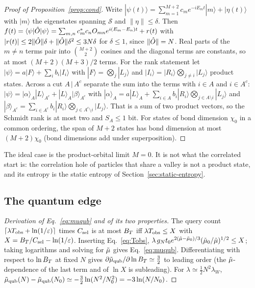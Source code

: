 \begin{proof}[Proof of Proposition~\ref{prop:cond}]
Write $|\psi(t)\rangle=\sum_{m=1}^{M+2}c_m e^{-iE_mt}|m\rangle+|\eta(t)\rangle$ with $|m\rangle$ the eigenstates spanning $\mathcal S$ and $\|\eta\|\le\delta$. Then $f(t)=\langle\psi|\hat O|\psi\rangle=\sum_{m,n}c_m^\ast c_n O_{mn}e^{i(E_m-E_n)t}+r(t)$ with $|r(t)|\le2\|\hat O\|\delta+\|\hat O\|\delta^2\le3N\delta$ for $\delta\le1$, since $\|\hat O\|=N$. Real parts of the $m\ne n$ terms pair into $\binom{M+2}2$ cosines and the diagonal terms are constants, so at most $(M+2)(M+3)/2$ terms. For the rank statement let $|\psi\rangle=a|F\rangle+\sum_ib_i|I_i\rangle$ with $|F\rangle=\bigotimes_j|L_j\rangle$ and $|I_i\rangle=|R_i\rangle\bigotimes_{j\ne i}|L_j\rangle$ product states. Across a cut $A\,|\,A^c$ separate the sum into the terms with $i\in A$ and $i\in A^c$: $|\psi\rangle=|\alpha\rangle_A|L\rangle_{A^c}+|L\rangle_A|\beta\rangle_{A^c}$ with $|\alpha\rangle_A=a|L\rangle_A+\sum_{i\in A}b_i|R_i\rangle\bigotimes_{j\in A\setminus i}|L_j\rangle$ and $|\beta\rangle_{A^c}=\sum_{i\in A^c}b_i|R_i\rangle\bigotimes_{j\in A^c\setminus i}|L_j\rangle$. That is a sum of two product vectors, so the Schmidt rank is at most two and $S_A\le1$ bit. For states of bond dimension $\chi_0$ in a common ordering, the span of $M+2$ states has bond dimension at most $(M+2)\chi_0$ (bond dimensions add under superposition).
\end{proof}
The ideal case is the product-orbital limit $M=0$. It is not what the correlated start is: the correlation hole of particles that share a valley is not a product state, and its entropy is the static entropy of Section~\ref{sec:static-entropy}.

\subsection{The quantum edge}

\begin{proof}[Derivation of Eq.~\eqref{eq:muqub} and of its two properties]
The query count $\lceil\lambda T_{\mathrm{obs}}+\ln(1/\varepsilon)\rceil$ times $C_{\rm sel}$ is at most $B_{T}$ iff $\lambda T_{\mathrm{obs}}\le X$ with $X=B_{T}/C_{\rm sel}-\ln(1/\varepsilon)$. Inserting Eq.~\eqref{eq:Tobs}, $\lambda\,g_N t_0e^{2(\tilde{\mu}-\tilde{\mu}_0)/3}(\tilde{\mu}_0/\tilde{\mu})^{1/2}\le X$; taking logarithms and solving for $\tilde{\mu}$ gives Eq.~\eqref{eq:muqub}. Differentiating with respect to $\ln B_{T}$ at fixed $N$ gives $\partial\tilde\mu_{\mathrm{qub}}/\partial\ln B_{T}\simeq\tfrac32$ to leading order
(the $\tilde{\mu}$-dependence of the last term and of $\ln X$ is subleading). For $\lambda\simeq\frac12N^2\lambda_W$, $\tilde\mu_{\mathrm{qub}}(N)-\tilde\mu_{\mathrm{qub}}(N_0)\simeq-\tfrac32\ln(N^2/N_0^2)=-3\ln(N/N_0)$.
\end{proof}

